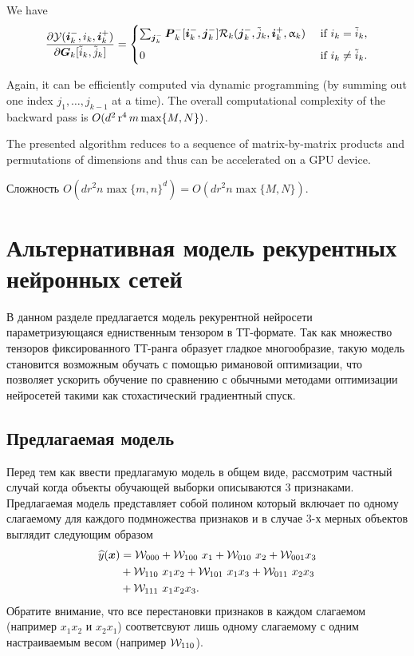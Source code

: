 We have
\begin{align*}
\frac{\partial \mathcal{Y}(\boldsymbol{i}_k^-, i_k, \boldsymbol{i}_k^+)}{\partial \boldsymbol{G}_k[\tilde{i}_k, \tilde{j}_k]} =
\begin{cases}
\sum_{\boldsymbol{j}_k^-} \boldsymbol{P}_k^-[\boldsymbol{i}_k^-, \boldsymbol{j}_k^-] \mathcal{R}_{k}(\boldsymbol{j}_{k}^-, \tilde{j}_k, \boldsymbol{i}_k^+, \upalpha_{k}) & \text{ if } i_k = \tilde{i}_k, \\[0.2cm]
0 & \text{ if } i_k \neq \tilde{i}_k.
\end{cases}
\end{align*}

Again, it can be efficiently computed via dynamic programming (by summing out one index $j_1, \ldots, j_{k-1}$ at a time). The overall computational complexity of the backward pass is $O(d^2 \operatorname{r}^4 m \max\{M, N\})$.

The presented algorithm reduces to a sequence of matrix-by-matrix products and permutations of dimensions and thus can be accelerated on a GPU device.


Сложность $O(d r^2 n \max\{m, n\}^d) = O(d r^2 n \max\{M, N\})$.

\section{Альтернативная модель рекурентных нейронных сетей}
В данном разделе предлагается модель рекурентной нейросети параметризующаяся едниственным тензором в ТТ-формате. Так как множество тензоров фиксированного ТТ-ранга образует гладкое многообразие, такую модель становится возможным обучать с помощью римановой оптимизации, что позволяет ускорить обучение по сравнению с обычными методами оптимизации нейросетей такими как стохастический градиентный спуск.

\subsection{Предлагаемая модель}
Перед тем как ввести предлагамую модель в общем виде, рассмотрим частный случай когда объекты обучающей выборки описываются $3$ признаками. Предлагаемая модель представляет собой полином который включает по одному слагаемому для каждого подмножества признаков и в случае $3$-х мерных объектов выглядит следующим образом
\begin{equation}
\label{eq:polynomial-model-example}
\begin{aligned}
\widehat{y}(\boldsymbol{x}) &= \mathcal{W}_{000} + \mathcal{W}_{100} \,\, x_1 + \mathcal{W}_{010} \,\, x_2 + \mathcal{W}_{001} x_3 \\
&+ \mathcal{W}_{110} \,\, x_1 x_2 + \mathcal{W}_{101} \,\, x_1 x_3 + \mathcal{W}_{011} \,\, x_2 x_3 \\
&+ \mathcal{W}_{111} \,\, x_1 x_2 x_3.
\end{aligned}
\end{equation}
Обратите внимание, что все перестановки признаков в каждом слагаемом (например $x_1 x_2$ и $x_2 x_1$) соответсвуют лишь одному слагаемому с одним настраиваемым весом (например $\mathcal{W}_{110}$).

